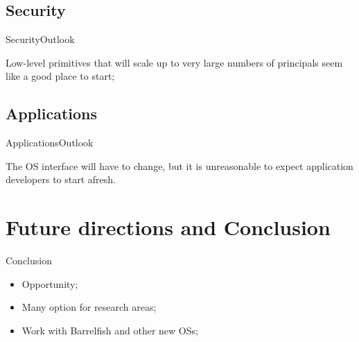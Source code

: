 \documentclass[10pt]{beamer}
\begin{document}
\subsection{Security}
\begin{frame}{Security}{Outlook}
  \begin{block}{}
    Low-level primitives that will scale up to very large numbers of principals
    seem like a good place to start;
  \end{block}
\end{frame}

\subsection{Applications}
\begin{frame}{Applications}{Outlook}
  \begin{block}{}
    The OS interface will have to change, but it is unreasonable to expect
    application developers to start afresh.
  \end{block}
\end{frame}

\section{Future directions and Conclusion}
\begin{frame}{Conclusion}{}
  \begin{itemize}
    \item Opportunity;
    \item Many option for research areas;
    \item Work with Barrelfish and other new OSs;
  \end{itemize}

\end{frame}

{\1
\begin{frame}
\end{frame}}
\end{document}
